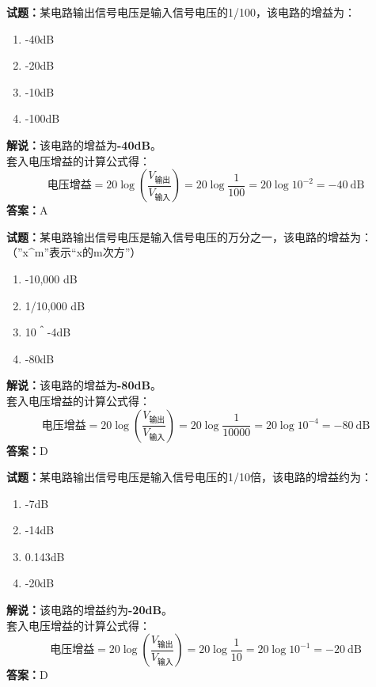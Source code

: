 \documentclass{ctexbook}
\begin{document}
\vspace{1em}

\textbf{试题：}某电路输出信号电压是输入信号电压的1/100，该电路的增益为：
\begin{enumerate}[leftmargin=3em]
  \item -40dB
  \item -20dB
  \item -10dB
  \item -100dB
\end{enumerate}
\noindent\textbf{解说：}该电路的增益为\textbf{-40dB}。\\
套入电压增益的计算公式得：
$$\mbox{电压增益}=20 \log \left( {\frac{V_{ \mbox{输出} }}{V_{ \mbox{输入} }}} \right)=20 \log \frac{1}{100}=20 \log 10^{-2}= -40 \ \mathrm{dB}$$
\noindent\textbf{答案：}A

\vspace{1em}

\textbf{试题：}某电路输出信号电压是输入信号电压的万分之一，该电路的增益为：（”x\string^m”表示“x的m次方”）
\begin{enumerate}[leftmargin=3em]
  \item -10,000 dB
  \item 1/10,000 dB
  \item 10＾-4dB
  \item -80dB
\end{enumerate}
\noindent\textbf{解说：}该电路的增益为\textbf{-80dB}。\\
套入电压增益的计算公式得：
$$\mbox{电压增益}=20 \log \left( {\frac{V_{ \mbox{输出} }}{V_{ \mbox{输入} }}} \right)=20 \log \frac{1}{10000}=20 \log 10^{-4}= -80 \ \mathrm{dB}$$
\noindent\textbf{答案：}D

\vspace{1em}

\textbf{试题：}某电路输出信号电压是输入信号电压的1/10倍，该电路的增益约为：
\begin{enumerate}[leftmargin=3em]
  \item -7dB
  \item -14dB
  \item 0.143dB
  \item -20dB
\end{enumerate}
\noindent\textbf{解说：}该电路的增益约为\textbf{-20dB}。\\
套入电压增益的计算公式得：
$$\mbox{电压增益}=20 \log \left( {\frac{V_{ \mbox{输出} }}{V_{ \mbox{输入} }}} \right)=20 \log \frac{1}{10}=20 \log 10^{-1}= -20 \ \mathrm{dB}$$
\noindent\textbf{答案：}D
\end{document}
